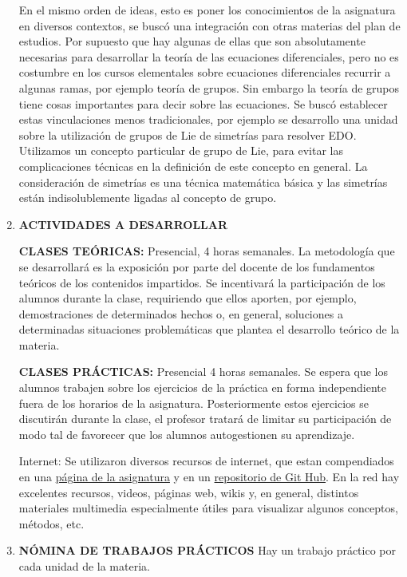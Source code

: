 \begin{enumerate}
	En el mismo orden de ideas, esto es poner los conocimientos de la asignatura en diversos contextos,  se buscó una integración con otras materias del plan de  estudios. Por supuesto que hay algunas de ellas que son absolutamente necesarias  para desarrollar la teoría de las ecuaciones diferenciales, pero no es costumbre en los cursos elementales sobre ecuaciones diferenciales recurrir a algunas ramas, por ejemplo teoría de grupos. Sin embargo la teoría de grupos tiene cosas importantes para decir sobre las ecuaciones. Se buscó establecer estas vinculaciones menos tradicionales, por ejemplo se desarrollo una unidad sobre la utilización de grupos de Lie de simetrías para resolver EDO.  Utilizamos un concepto particular de grupo de Lie, para evitar las complicaciones técnicas en la definición de este concepto en general.  La consideración de simetrías es una técnica matemática básica y las simetrías están indisolublemente ligadas al concepto de grupo.


 \item\textbf{  ACTIVIDADES A DESARROLLAR}

		  \textbf{ CLASES TEÓRICAS:} Presencial, 4 horas semanales. La metodología que se desarrollará es la exposición por parte del docente de los fundamentos teóricos de los contenidos impartidos. Se incentivará la participación de los alumnos durante la clase, requiriendo que ellos aporten, por ejemplo, demostraciones de determinados hechos o, en general, soluciones a determinadas situaciones problemáticas que plantea el desarrollo teórico de la materia.

		  \textbf{ CLASES PRÁCTICAS:} Presencial 4 horas semanales. Se espera que los alumnos trabajen sobre los ejercicios de la práctica en forma independiente fuera de los horarios de la asignatura. Posteriormente estos ejercicios se discutirán durante la clase,  el profesor tratará de limitar su participación de modo tal de favorecer que los alumnos autogestionen su aprendizaje.


		  Internet:  Se utilizaron diversos recursos de internet, que estan compendiados en una \href{http://fdmazzone.github.io/Ecuaciones_Diferenciales/}{página de la asignatura} y en un \href{https://github.com/fdmazzone/Ecuaciones_Diferenciales}{repositorio de Git Hub}.  En la red  hay excelentes recursos, videos, páginas web, wikis  y, en general, distintos materiales multimedia especialmente útiles para visualizar algunos conceptos, métodos, etc.

 \item\textbf{  NÓMINA DE TRABAJOS PRÁCTICOS}
		Hay un trabajo práctico por cada unidad de la materia.


\end{enumerate}
